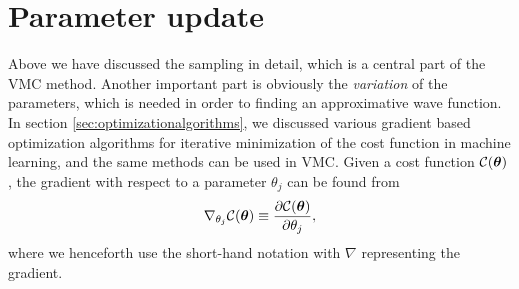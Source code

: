 \section{Parameter update} \label{sec:parameterupdate}
Above we have discussed the sampling in detail, which is a central part of the VMC method. Another important part is obviously the \textit{variation} of the parameters, which is needed in order to finding an approximative wave function. In section \ref{sec:optimizationalgorithms}, we discussed various gradient based optimization algorithms for iterative minimization of the cost function in machine learning, and the same methods can be used in VMC. Given a cost function $\mathcal{C}(\boldsymbol{{\theta}})$, the gradient with respect to a parameter $\theta_j$ can be found from
\begin{equation}
\nabla_{\theta_j} \mathcal{C}(\boldsymbol{{\theta}})\equiv\frac{\partial \mathcal{C}(\boldsymbol{{\theta}})}{\partial \theta_j},
\end{equation}
where we henceforth use the short-hand notation with $\nabla$ representing the gradient. 

